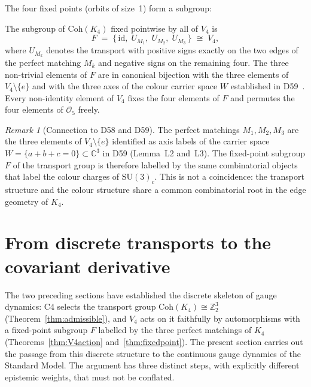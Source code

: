 \documentclass[11pt,a4paper]{article}
\newenvironment{theorembox}[1][]{%
  \begin{tcolorbox}[theoremstyle,title={Theorem%
    \ifx\relax#1\relax\else: #1\fi}]}{\end{tcolorbox}}
\theoremstyle{plain}
\theoremstyle{definition}
\theoremstyle{remark}
\newtheorem{remark}[theorem]{Remark}
\newcommand{\Kfour}{K_4}
\newcommand{\Vfour}{V_4}
\newcommand{\Coh}{\mathrm{Coh}(K_4)}
\begin{document}
The four fixed points (orbits of size~1) form a subgroup:

\begin{theorembox}[Fixed-point subgroup $F \cong \Vfour$, labelled by perfect matchings]
\label{thm:fixedpoint}
The subgroup of $\Coh$ fixed pointwise by all of $\Vfour$ is
\begin{equation}
F \;=\; \bigl\{\,\mathrm{id},\; U_{M_1},\; U_{M_2},\; U_{M_3}\,\bigr\}
\;\cong\; \Vfour,
\label{eq:F}
\end{equation}
where $U_{M_k}$ denotes the transport with positive signs exactly on the two edges of
the perfect matching $M_k$ and negative signs on the remaining four. The three
non-trivial elements of $F$ are in canonical bijection with the three elements of
$\Vfour \setminus \{e\}$ and with the three axes of the colour carrier space $W$
established in D59~\cite{PDL_D59}. Every non-identity element of $\Vfour$ fixes the
four elements of $F$ and permutes the four elements of $\mathcal{O}_5$ freely.
\end{theorembox}

\begin{remark}[Connection to D58 and D59]
The perfect matchings $M_1, M_2, M_3$ are the three elements of $\Vfour \setminus \{e\}$
identified as axis labels of the carrier space $W = \{a+b+c=0\} \subset \mathbb{C}^3$
in D59 (Lemma~L2 and~L3). The fixed-point subgroup $F$ of the transport group is
therefore labelled by the same combinatorial objects that label the colour charges
of $\mathrm{SU}(3)_c$. This is not a coincidence: the transport structure and the
colour structure share a common combinatorial root in the edge geometry of $\Kfour$.
\end{remark}

\section{From discrete transports to the covariant derivative}
\label{sec:completion}

The two preceding sections have established the discrete skeleton of gauge dynamics:
C4 selects the transport group $\Coh \cong \mathbb{Z}_2^3$ (Theorem~\ref{thm:admissible}),
and $\Vfour$ acts on it faithfully by automorphisms with a fixed-point subgroup $F$
labelled by the three perfect matchings of $\Kfour$ (Theorems~\ref{thm:V4action}
and~\ref{thm:fixedpoint}). The present section carries out the passage from this
discrete structure to the continuous gauge dynamics of the Standard Model. The
argument has three distinct steps, with explicitly different epistemic weights,
that must not be conflated.
\end{document}
